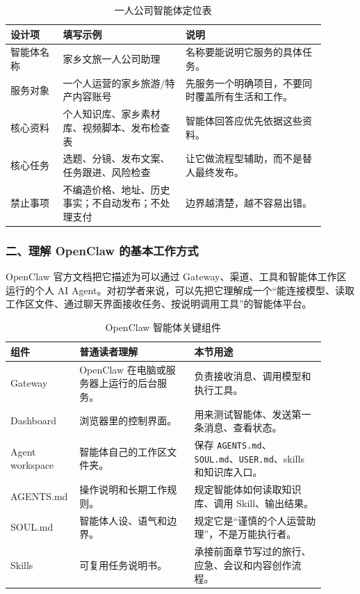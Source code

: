 \begin{table}[H]
\centering
\caption{一人公司智能体定位表}
\label{tab:oneperson-agent-position}
\begin{tabular}{p{0.15\linewidth} p{0.35\linewidth} p{0.40\linewidth}}
\toprule
\textbf{设计项} & \textbf{填写示例} & \textbf{说明} \\
\midrule
智能体名称 & 家乡文旅一人公司助理 & 名称要能说明它服务的具体任务。 \\
服务对象 & 一个人运营的家乡旅游/特产内容账号 & 先服务一个明确项目，不要同时覆盖所有生活和工作。 \\
核心资料 & 个人知识库、家乡素材库、视频脚本、发布检查表 & 智能体回答应优先依据这些资料。 \\
核心任务 & 选题、分镜、发布文案、任务跟进、风险检查 & 让它做流程型辅助，而不是替人最终发布。 \\
禁止事项 & 不编造价格、地址、历史事实；不自动发布；不处理支付 & 边界越清楚，越不容易出错。 \\
\bottomrule
\end{tabular}
\end{table}

\subsubsection*{二、理解 OpenClaw 的基本工作方式}

OpenClaw 官方文档把它描述为可以通过 Gateway、渠道、工具和智能体工作区运行的个人 AI Agent。对初学者来说，可以先把它理解成一个“能连接模型、读取工作区文件、通过聊天界面接收任务、按说明调用工具”的智能体平台。

\begin{table}[H]
\centering
\caption{OpenClaw 智能体关键组件}
\label{tab:openclaw-components}
\begin{tabular}{p{0.15\linewidth} p{0.35\linewidth} p{0.40\linewidth}}
\toprule
\textbf{组件} & \textbf{普通读者理解} & \textbf{本节用途} \\
\midrule
Gateway & OpenClaw 在电脑或服务器上运行的后台服务。 & 负责接收消息、调用模型和执行工具。 \\
Dashboard & 浏览器里的控制界面。 & 用来测试智能体、发送第一条消息、查看状态。 \\
Agent workspace & 智能体自己的工作区文件夹。 & 保存 \texttt{AGENTS.md}、\texttt{SOUL.md}、\texttt{USER.md}、skills 和知识库入口。 \\
AGENTS.md & 操作说明和长期工作规则。 & 规定智能体如何读取知识库、调用 Skill、输出结果。 \\
SOUL.md & 智能体人设、语气和边界。 & 规定它是“谨慎的个人运营助理”，不是万能执行者。 \\
Skills & 可复用任务说明书。 & 承接前面章节写过的旅行、应急、会议和内容创作流程。 \\
\bottomrule
\end{tabular}
\end{table}

